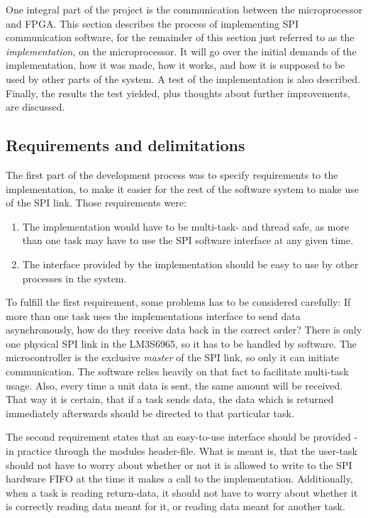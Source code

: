 \label{sec:armspi}
One integral part of the project is the communication between the microprocessor and FPGA. This section describes the process of implementing SPI communication software, for the remainder of this section just referred to as the \textit{implementation}, on the microprocessor. It will go over the initial demands of the implementation, how it was made, how it works, and how it is supposed to be used by other parts of the system. A test of the implementation is also described. Finally, the results the test yielded, plus thoughts about further improvements, are discussed.

\subsection{Requirements and delimitations}\label{sec:spi_software_reqs}
The first part of the development process was to specify requirements to the implementation, to make it easier for the rest of the software system to make use of the SPI link. Those requirements were:
\begin{enumerate}
  \item The implementation would have to be multi-task- and thread safe, as more than one task may have to use the SPI software interface at any given time.
  \item The interface provided by the implementation should be easy to use by other processes in the system.
\end{enumerate}

To fulfill the first requirement, some problems has to be considered carefully: If more than one task uses the implementations interface to send data asynchronously, how do they receive data back in the correct order? There is only one physical SPI link in the LM3S6965, so it has to be handled by software.
The microcontroller is the exclusive \textit{master} of the SPI link, so only it can initiate communication. The software relies heavily on that fact to facilitate multi-task usage. Also, every time a unit data is sent, the same amount will be received. That way it is certain, that if a task sends data, the data which is returned immediately afterwards should be directed to that particular task.

The second requirement states that an easy-to-use interface should be provided - in practice through the modules header-file. What is meant is, that the user-task should not have to worry about whether or not it is allowed to write to the SPI hardware FIFO at the time it makes a call to the implementation. Additionally, when a task is reading return-data, it should not have to worry about whether it is correctly reading data meant for it, or reading data meant for another task.

